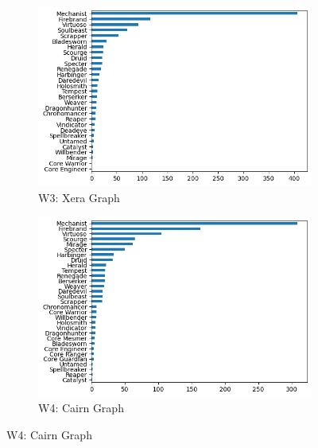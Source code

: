 \documentclass[12pt,a4paper]{article}
\begin{document}
\begin{figure}[h!]
        \begin{subfigure}{0.5\textwidth}
            \centering
            \includegraphics[scale=0.4]{xera_graph.png}
            \caption{\small W3: Xera Graph}
        \end{subfigure}%
        \begin{subfigure}{0.5\textwidth}
            \centering
            \includegraphics[scale=0.4]{cairn_graph.png}
            \caption{\small W4: Cairn Graph}
        \end{subfigure}


\end{figure}
\end{document}
